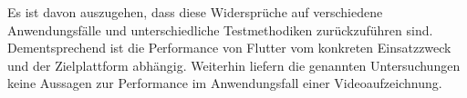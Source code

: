Es ist davon auszugehen, dass diese Widersprüche auf verschiedene Anwendungsfälle und unterschiedliche Testmethodiken zurückzuführen sind.
Dementsprechend ist die Performance von Flutter vom konkreten Einsatzzweck und der Zielplattform abhängig.
Weiterhin liefern die genannten Untersuchungen keine Aussagen zur Performance im Anwendungsfall einer Videoaufzeichnung.